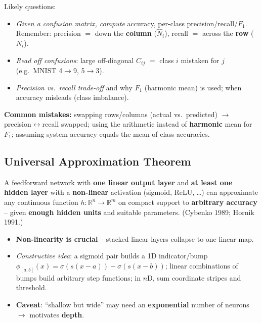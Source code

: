 \documentclass[10pt,a4paper]{article}
\begin{document}
	\begin{examtipbox}
		Likely questions:
		\begin{itemize}[leftmargin=*]
			\item \emph{Given a confusion matrix, compute} accuracy, per-class precision/recall/$F_1$. Remember: precision $=$ down the \textbf{column} ($\hat N_i$), recall $=$ across the \textbf{row} ($N_i$).
			\item \emph{Read off confusions}: large off-diagonal $C_{ij}$ $=$ class $i$ mistaken for $j$ (e.g.\ MNIST 4$\to$9, 5$\to$3).
			\item \emph{Precision vs.\ recall trade-off} and why $F_1$ (harmonic mean) is used; when accuracy misleads (class imbalance).
		\end{itemize}
		\textbf{Common mistakes:} swapping rows/columns (actual vs.\ predicted) $\rightarrow$ precision$\leftrightarrow$recall swapped; using the arithmetic instead of \textbf{harmonic} mean for $F_1$; assuming system accuracy equals the mean of class accuracies.
	\end{examtipbox}

	\subsection{Universal Approximation Theorem}

	\begin{definitionbox}
		A feedforward network with \textbf{one linear output layer} and \textbf{at least one hidden layer} with a \textbf{non-linear} activation (sigmoid, ReLU, \dots) can approximate any continuous function $h:\mathbb{R}^n\to\mathbb{R}^m$ on compact support to \textbf{arbitrary accuracy} -- given \textbf{enough hidden units} and suitable parameters. (Cybenko 1989; Hornik 1991.)
	\end{definitionbox}

	\begin{itemize}[leftmargin=*]
		\item \textbf{Non-linearity is crucial} -- stacked linear layers collapse to one linear map.
		\item \emph{Constructive idea}: a sigmoid pair builds a 1D indicator/bump $\phi_{[a,b]}(x)=\sigma(s(x-a))-\sigma(s(x-b))$; linear combinations of bumps build arbitrary step functions; in $n$D, sum coordinate stripes and threshold.
		\item \textbf{Caveat}: ``shallow but wide'' may need an \textbf{exponential} number of neurons $\rightarrow$ motivates \textbf{depth}.
	\end{itemize}
\end{document}
